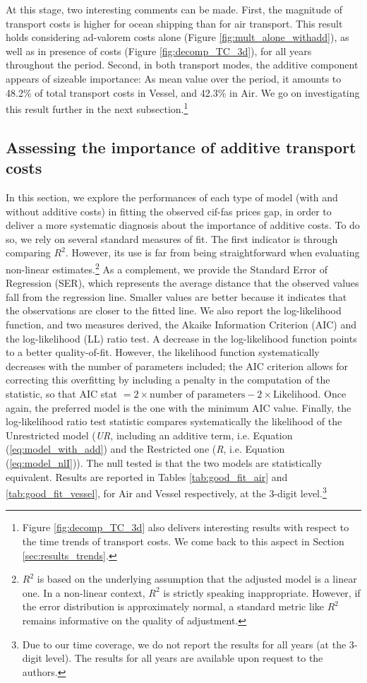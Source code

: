 \documentclass[a4paper,11pt]{article}
\begin{document}
At this stage, two interesting comments can be made. First, the magnitude of transport costs is higher for ocean shipping than for air transport. This result holds considering ad-valorem costs alone (Figure \ref{fig:mult_alone_withadd}), as well as in presence of costs (Figure \ref{fig:decomp_TC_3d}), for all years throughout the period. Second, in both transport modes, the additive component appears of sizeable importance: As mean value over the period, it amounts to 48.2\% of total transport costs in Vessel, and 42.3\% in Air. We go on investigating this result further in the next subsection.\footnote{Figure \ref{fig:decomp_TC_3d} also delivers interesting results with respect to the time trends of transport costs. We come back to this aspect in Section \ref{sec:results_trends}.}

\subsection{Assessing the importance of additive transport costs}

In this section, we explore the performances of each type of model (with and without additive costs) in fitting the observed cif-fas prices gap, in order to deliver a more systematic diagnosis about the importance of additive costs. To do so, we rely on several standard measures of fit. The first indicator is through comparing $R^{2}$. However, its use is far from being straightforward when evaluating non-linear estimates.\footnote{$R^2$ is based on the underlying assumption that the adjusted model is a linear one. In a non-linear context, $R^2$ is  strictly speaking inappropriate. However, if the error distribution is approximately normal, a standard metric like $R^2$ remains informative on the quality of adjustment.} As a complement, we provide the Standard Error of Regression (SER), which represents the average distance that the observed values fall from the regression line. Smaller values are better because it indicates that the observations are closer to the fitted line. We also report the log-likelihood function, and two measures derived, the Akaike Information Criterion (AIC) and the log-likelihood (LL) ratio test. A decrease in the log-likelihood function points to a better quality-of-fit. However, the likelihood function systematically decreases with the number of parameters included; the AIC criterion allows for correcting this overfitting by including a penalty in the computation of the statistic, so that AIC stat $= 2 \times \textrm{number of parameters} - 2 \times \textrm{Likelihood} $. Once again, the preferred model is the one with the minimum AIC value. Finally, the log-likelihood ratio test statistic compares systematically the likelihood of the Unrestricted model (\emph{UR}, including an additive term, i.e. Equation (\ref{eq:model_with_add}) and the Restricted one (\emph{R}, i.e. Equation (\ref{eq:model_nlI})). The null tested is that the two models are statistically equivalent. Results are reported in Tables \ref{tab:good_fit_air} and \ref{tab:good_fit_vessel}, for Air and Vessel respectively, at the 3-digit level.\footnote{Due to our time coverage, we do not report the results for all years (at the 3-digit level). The results for all years are available upon request to the authors.}\medskip
\end{document}
